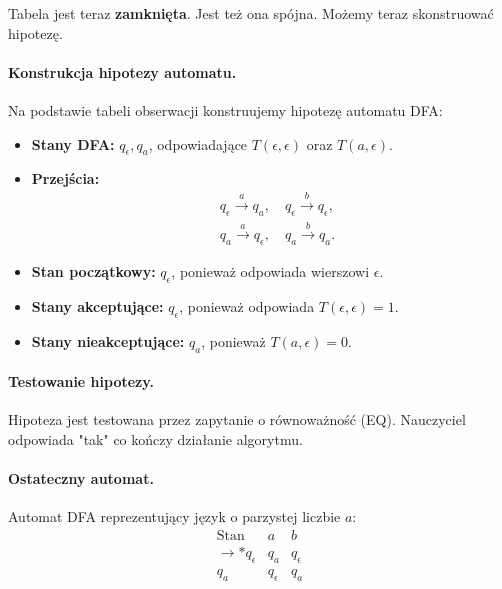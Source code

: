 Tabela jest teraz \textbf{zamknięta}. Jest też ona spójna. Możemy teraz skonstruować hipotezę.

\paragraph*{Konstrukcja hipotezy automatu.}
Na podstawie tabeli obserwacji konstruujemy hipotezę automatu DFA:
\begin{itemize}
    \item \textbf{Stany DFA:} \( q_\epsilon, q_a \), odpowiadające \( T(\epsilon, \epsilon) \) oraz \( T(a, \epsilon) \).
    \item \textbf{Przejścia:}
    \begin{align*}
        & q_\epsilon \xrightarrow{a} q_a, \quad q_\epsilon \xrightarrow{b} q_\epsilon, \\
        & q_a \xrightarrow{a} q_\epsilon, \quad q_a \xrightarrow{b} q_a.
    \end{align*}
    \item \textbf{Stan początkowy:} \( q_\epsilon \), ponieważ odpowiada wierszowi \( \epsilon \).
    \item \textbf{Stany akceptujące:} \( q_\epsilon \), ponieważ odpowiada \( T(\epsilon, \epsilon) = 1 \).
    \item \textbf{Stany nieakceptujące:} \( q_a \), ponieważ \( T(a, \epsilon) = 0 \).
\end{itemize}

\paragraph*{Testowanie hipotezy.}
Hipoteza jest testowana przez zapytanie o równoważność (EQ). Nauczyciel odpowiada "tak" co kończy działanie algorytmu. 

\paragraph*{Ostateczny automat.}
Automat DFA reprezentujący język o parzystej liczbie \( a \):
\[
\begin{array}{c|c|c}
\text{Stan} & a & b \\
\hline
\rightarrow * q_\epsilon & q_a & q_\epsilon \\
q_a & q_\epsilon & q_a \\
\end{array}
\]


